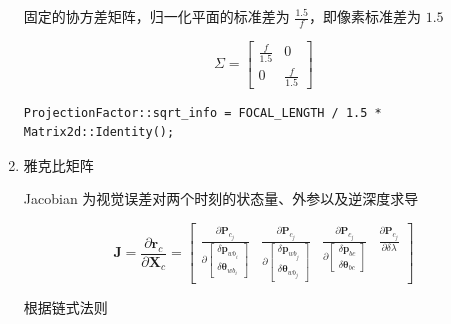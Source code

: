 \documentclass[12pt,a4paper]{article}
\begin{document}
\begin{enumerate}
固定的协方差矩阵，归一化平面的标准差为 $\frac{1.5}{f}$，即像素标准差为 $1.5$

\begin{equation}
\Sigma = 
\begin{bmatrix}
\frac{f}{1.5} & 0 \\
0 & \frac{f}{1.5}
\end{bmatrix}
\end{equation}

\begin{lstlisting}
ProjectionFactor::sqrt_info = FOCAL_LENGTH / 1.5 * Matrix2d::Identity();
\end{lstlisting}

\item 雅克比矩阵

Jacobian 为视觉误差对两个时刻的状态量、外参以及逆深度求导

\begin{equation}
\mathbf{J} = 
\frac{\partial \mathbf{r}_{c}}{\partial \mathbf{X}_{c}} =
\begin{bmatrix}
\frac{\partial \mathbf{P}_{c_{j}}}
{\partial\left[\begin{array}{c}{\delta \mathbf{p}_{w b_{i}}} \\ 
{\delta \boldsymbol{\theta}_{w b_{i}}}\end{array}\right]} 
&
\frac{\partial \mathbf{P}_{c_{j}}}
{\partial\left[\begin{array}{c}{\delta \mathbf{p}_{w b_{j}}} \\ 
{\delta \boldsymbol{\theta}_{w b_{j}}}\end{array}\right]} 
&
\frac{\partial \mathbf{P}_{c_{j}}}
{\partial\left[\begin{array}{c}{\delta \mathbf{p}_{bc}} \\ 
{\delta \boldsymbol{\theta}_{bc}}\end{array}\right]} 
&
\frac{\partial \mathbf{P}_{c_{j}}}{\partial \delta \lambda}
\end{bmatrix}
\end{equation}

根据链式法则


\end{enumerate}
\end{document}

